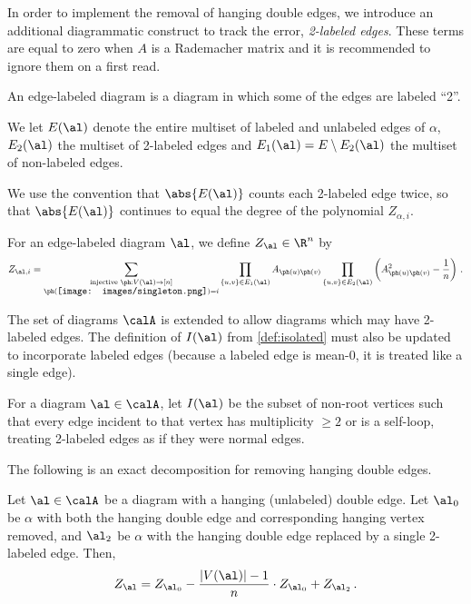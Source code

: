 \documentclass[12pt]{article}
\newcommand{\smallrootpic}{\vcenter{\hbox{\texttt{[image: images/singleton.png]}}}}
\begin{document}
In order to implement the removal of hanging double edges, we introduce
an additional diagrammatic construct to track the error,
\emph{2-labeled edges}.
These terms are equal to zero when $A$ is a Rademacher matrix
and it is recommended to ignore them on a first read.


\begin{definition}
    \label{def:labeled-diagram}
    An edge-labeled diagram is a diagram in which some of the edges
    are labeled ``2''.

    We let $E(\al)$ denote the entire multiset of labeled and unlabeled edges of $\alpha$, $E_2(\al)$
    the multiset of 2-labeled edges and $E_1(\al)=E\setminus E_2(\al)$ the multiset of non-labeled edges.

    We use the convention that $\abs{E(\al)}$ counts each 2-labeled edge
twice, so that $\abs{E(\al)}$ continues to equal the degree of the polynomial $Z_{\alpha,i}$.
\end{definition}

\begin{definition}
    For an edge-labeled diagram $\al$, we define $Z_\al \in \R^n$ by
    \[Z_{\al, i} = \sum_{\substack{\textnormal{injective }\ph: V(\al) \to [n]\\\ph(\smallrootpic) = i}} \prod_{\{u,v\} \in E_1(\al)} A_{\ph(u)\ph(v)} \prod_{\{u,v\} \in E_2(\al)} \left(A_{\ph(u)\ph(v)}^2 - \frac{1}{n}\right)\,.\]
\end{definition}


The set of diagrams $\calA$ is extended to allow diagrams which may have 2-labeled edges.
The definition of $I(\al)$ from \cref{def:isolated} must also be updated to incorporate labeled edges
(because a labeled edge is mean-0, it is treated like a single edge).
\begin{definition}
     For a diagram $\al \in \calA$, let $I(\al)$ be the subset
     of non-root vertices such that every edge incident to that vertex has multiplicity $\geq 2$ or is a self-loop, treating 2-labeled edges as if they were normal edges.
 \end{definition}


The following is an exact decomposition for removing hanging double edges.
\begin{lemma}\label{lem:syntactic-removal}
    Let $\al \in \calA$ be a diagram with a hanging (unlabeled) double edge. Let $\al_0$ be $\alpha$ with both the hanging double edge and corresponding hanging vertex removed, and $\al_2$ be $\alpha$ with the hanging double edge replaced by a single 2-labeled edge. Then,
        \[
            Z_\al = Z_{\al_0} - \frac{|V(\al)|-1}{n} \cdot Z_{\al_0} + Z_{\al_2}\,.
        \]
\end{lemma}
\end{document}

